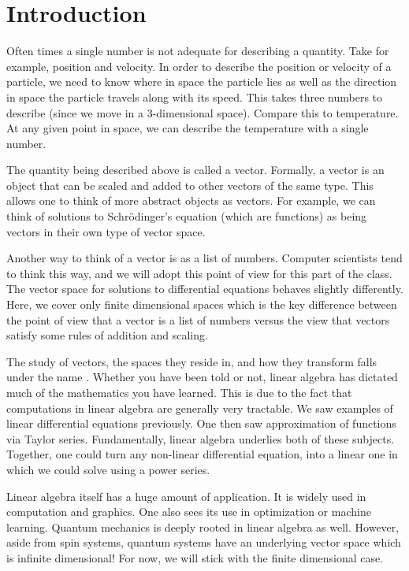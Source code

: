 
    \section*{Introduction}
        Often times a single number is not adequate for describing a quantity.  Take for example, position and velocity.  In order to describe the position or velocity of a particle, we need to know where in space the particle lies as well as the direction in space the particle travels along with its speed.  This takes three numbers to describe (since we move in a 3-dimensional space). Compare this to temperature.  At any given point in space, we can describe the temperature with a single number. 
        
        The quantity being described above is called a vector.  Formally, a vector is an object that can be scaled and added to other vectors of the same type. This allows one to think of more abstract objects as vectors. For example, we can think of solutions to Schr\"odinger's equation (which are functions) as being vectors in their own type of vector space.
        
        Another way to think of a vector is as a list of numbers. Computer scientists tend to think this way, and we will adopt this point of view for this part of the class.  The vector space for solutions to differential equations behaves slightly differently.  Here, we cover only finite dimensional spaces which is the key difference between the point of view that a vector is a list of numbers versus the view that vectors satisfy some rules of addition and scaling.
        
        The study of vectors, the spaces they reside in, and how they transform falls under the name . Whether you have been told or not, linear algebra has dictated much of the mathematics you have learned.  This is due to the fact that computations in linear algebra are generally very tractable.  We saw examples of linear differential equations previously.  One then saw approximation of functions via Taylor series.  Fundamentally, linear algebra underlies both of these subjects. Together, one could turn any non-linear differential equation, into a linear one in which we could solve using a power series.
        
        Linear algebra itself has a huge amount of application.  It is widely used in computation and graphics.  One also sees its use in optimization or machine learning.  Quantum mechanics is deeply rooted in linear algebra as well. However, aside from spin systems, quantum systems have an underlying vector space which is infinite dimensional!  For now, we will stick with the finite dimensional case.
        
